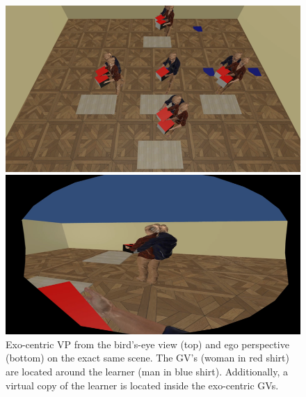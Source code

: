 \begin{figure}[H]
	\centering
	\includegraphics[width=\textwidth]{figures/perspectiveEXO.png}
	\caption[Exo-centric visual perspective]{Exo-centric VP from the bird's-eye view (top) and ego perspective (bottom) on the exact same scene. The GV's (woman in red shirt) are located around the learner (man in blue shirt). Additionally, a virtual copy of the learner is located inside the exo-centric GVs.}
	\label{fig:exo}
\end{figure}
